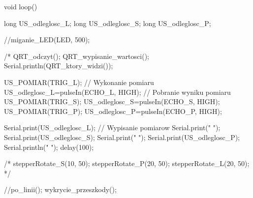 void loop() {
  long US_odleglosc_L;
  long US_odleglosc_S;
  long US_odleglosc_P;
  
  //miganie_LED(LED, 500);

  /*
  QRT_odczyt();
  QRT_wypisanie_wartosci();
  Serial.println(QRT_ktory_widzi());

  US_POMIAR(TRIG_L);                    // Wykonanie pomiaru
  US_odleglosc_L=pulseIn(ECHO_L, HIGH); // Pobranie wyniku pomiaru
  US_POMIAR(TRIG_S);
  US_odleglosc_S=pulseIn(ECHO_S, HIGH);
  US_POMIAR(TRIG_P);
  US_odleglosc_P=pulseIn(ECHO_P, HIGH);
  
  Serial.print(US_odleglosc_L);         // Wypisanie pomiarow
  Serial.print(" ");
  Serial.print(US_odleglosc_S);
  Serial.print(" ");
  Serial.print(US_odleglosc_P);
  Serial.println(" ");
  delay(100);
  

  /*
  stepperRotate_S(10, 50);
  stepperRotate_P(20, 50);
  stepperRotate_L(20, 50);
  */
  
  //po_linii();
  wykrycie_przeszkody();
}